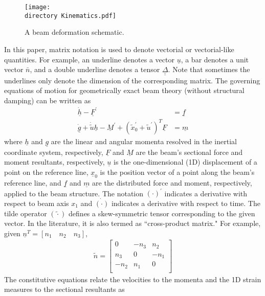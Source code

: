 \documentclass{aiaa-tc}
\def\directory{EPSF/}
\renewcommand{\vec}[1]{\underline{#1}}
\renewcommand{\skew}[1]{\widetilde{#1}}
\begin{document}
\begin{figure}[h!tp]
\centering
\texttt{[image: \\directory Kinematics.pdf]}
\caption{A beam deformation schematic.} \label{Kinematics}
\end{figure}

In this paper, matrix notation is used to denote vectorial or vectorial-like quantities. For example, an underline denotes a vector $\underline{u}$, a bar denotes a unit vector $\bar{n}$, and a double underline denotes a tensor $\underline{\underline{\Delta}}$. Note that sometimes the underlines only denote the dimension of the corresponding matrix. The governing equations of motion for geometrically exact beam theory (without structural damping) can be written as \cite{Bauchau:2010}
\begin{align}
	\label{GovernGEBT-1}
	\dot{\underline{h}} - \underline{F}^\prime &= \underline{f} \\
	\label{GovernGEBT-2}
	\dot{\underline{g}} + \dot{\tilde{u}} \underline{h} - \underline{M}^\prime + (\tilde{x}_0^\prime + \tilde{u}^\prime)^T \underline{F} &= \underline{m}
\end{align}
where $\vec{h}$ and $\vec{g}$ are the linear and angular momenta resolved in the inertial coordinate system, respectively, $\vec{F}$ and $\vec{M}$ are the beam's sectional force and moment resultants, respectively, $\vec{u}$ is the one-dimensional (1D) displacement of a point on the reference line, $\vec{x}_0$ is the position vector of a point along the beam's reference line,  and $\vec{f}$ and $\vec{m}$ are the distributed force and moment, respectively, applied to the beam structure.  The notation $(\cdot)^\prime$ indicates a derivative with respect to beam axis $x_1$ and $\dot{(\cdot)}$ indicates a derivative with respect to time. The tilde operator $(\skew{\cdot})$ defines a skew-symmetric tensor corresponding to the given vector. In the literature, it is also termed as ``cross-product matrix." For example, given $\vec{n}^T=[ n_1\quad n_2 \quad n_3]$,
\begin{align}
	\skew{n} = \begin{bmatrix}
			0 & -n_3 & n_2 \\
			n_3 & 0 & -n_1 \\
			-n_2 & n_1 & 0\\
			\end{bmatrix}	
\end{align}
The constitutive equations relate the velocities to the momenta and the 1D strain measures to the sectional resultants as
\end{document}
